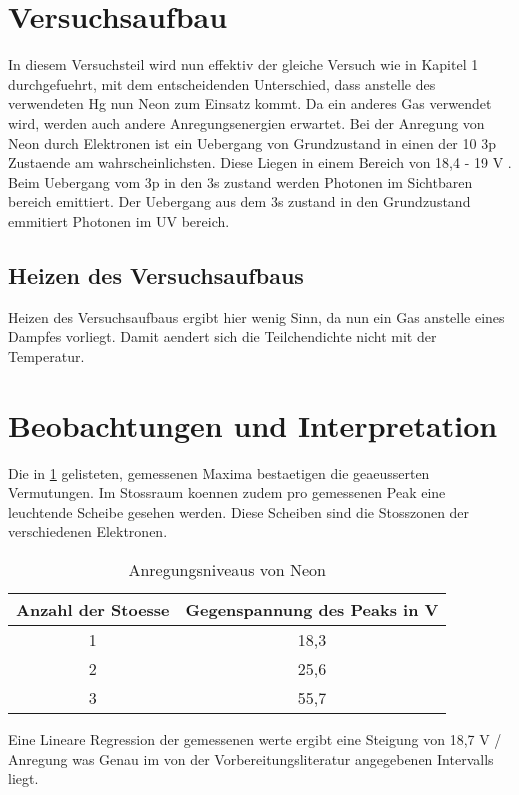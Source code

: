 \section{Versuchsaufbau}
In diesem Versuchsteil wird nun effektiv der gleiche Versuch wie in Kapitel 1 durchgefuehrt, mit dem entscheidenden Unterschied, dass anstelle des verwendeten Hg nun Neon zum Einsatz kommt.
Da ein anderes Gas verwendet wird, werden auch andere Anregungsenergien erwartet.
Bei der Anregung von Neon durch Elektronen ist ein Uebergang von Grundzustand in einen der 10 3p Zustaende am wahrscheinlichsten. Diese Liegen in einem Bereich von 18,4 - 19 V \cite{HND1}.
Beim Uebergang vom 3p in den 3s zustand werden Photonen im Sichtbaren bereich emittiert. Der Uebergang aus dem 3s zustand in den Grundzustand emmitiert Photonen im UV bereich.
\subsection{Heizen des Versuchsaufbaus}
Heizen des Versuchsaufbaus ergibt hier wenig Sinn, da nun ein Gas anstelle eines Dampfes vorliegt. Damit aendert sich die Teilchendichte nicht mit der Temperatur.
\section{Beobachtungen und Interpretation}
Die in \ref{tab:gemesseneAnregungsenergieNeon} gelisteten, gemessenen Maxima bestaetigen die geaeusserten Vermutungen.
Im Stossraum koennen zudem pro gemessenen Peak eine leuchtende Scheibe gesehen werden. Diese Scheiben sind die Stosszonen der verschiedenen Elektronen.
\begin{table}
	\centering
	\caption{Anregungsniveaus von Neon}
	\begin{tabular}{c c}
		Anzahl der Stoesse & Gegenspannung des Peaks in V \\
		\midrule
		1 & 18,3 \\
		2 & 25,6 \\
		3 & 55,7 \\
	\end{tabular}
	\label{tab:gemesseneAnregungsenergieNeon}
\end{table}
Eine Lineare Regression der gemessenen werte ergibt eine Steigung von 18,7 V / Anregung was Genau im von der Vorbereitungsliteratur angegebenen Intervalls liegt.

